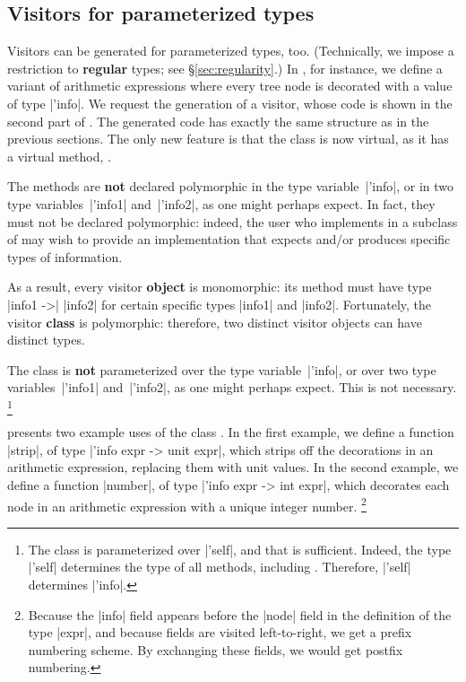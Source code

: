 \documentclass[11pt,a4paper,twoside]{article}
\renewcommand{\emph}[1]{\textbf{#1}}
\begin{document}
\subsection{Visitors for parameterized types}
\label{sec:intro:parameterized}

Visitors can be generated for parameterized types, too. (Technically, we
impose a restriction to \emph{regular} types; see \S\ref{sec:regularity}.)
%
In , for instance, we define a variant of arithmetic
expressions where every tree node is decorated with a value of type
\oc|'info|. We request the generation of a \map visitor, whose code is shown
in the second part of . The generated code has exactly the
same structure as in the previous sections. The only new feature is that the
class \map is now virtual, as it has a virtual method, .

The methods are \emph{not} declared polymorphic in the type
variable~\oc|'info|, or in two type variables~\oc|'info1| and~\oc|'info2|, as
one might perhaps expect. In fact, they must not be declared polymorphic:
indeed, the user who implements  in a subclass of \map may
wish to provide an implementation that expects and/or produces specific types
of information.

As a result, every visitor \emph{object} is monomorphic: its method
 must have type \oc|info1 ->| \oc|info2| for certain specific
types \oc|info1| and \oc|info2|. Fortunately, the visitor \emph{class} is
polymorphic: therefore, two distinct visitor objects can have distinct types.

The class \map is \emph{not} parameterized over the type variable~\oc|'info|,
or over two type variables~\oc|'info1| and~\oc|'info2|, as one might perhaps
expect. This is not necessary.%
\footnote{The class is parameterized over \oc|'self|, and that is sufficient.
  Indeed, the type \oc|'self| determines the type of all methods, including
  . Therefore, \oc|'self| determines \oc|'info|.}

 presents two example uses of the class \map. In the first
example, we define a function \oc|strip|, of type \oc|'info expr -> unit expr|,
which strips off the decorations in an arithmetic expression, replacing them
with unit values. In the second example, we define a function \oc|number|,
of type \oc|'info expr -> int expr|, which decorates each node in an arithmetic
expression with a unique integer number.%
\footnote{Because the \oc|info| field appears before the \oc|node| field in
  the definition of the type \oc|expr|, and because fields are visited
  left-to-right, we get a prefix numbering scheme. By exchanging these fields,
  we would get postfix numbering.}
\end{document}
